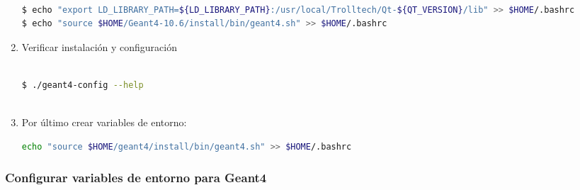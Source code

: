 \begin{enumerate}
\begin{lstlisting}[language=bash,style=mystyle]

$ echo "export LD_LIBRARY_PATH=${LD_LIBRARY_PATH}:/usr/local/Trolltech/Qt-${QT_VERSION}/lib" >> $HOME/.bashrc
$ echo "source $HOME/Geant4-10.6/install/bin/geant4.sh" >> $HOME/.bashrc


\end{lstlisting}     


    \item Verificar instalación y configuración


\begin{lstlisting}[language=bash,style=mystyle]

$ ./geant4-config --help
 
\end{lstlisting} 

\item Por último crear variables de entorno:


\begin{lstlisting}[language=bash,style=mystyle]
echo "source $HOME/geant4/install/bin/geant4.sh" >> $HOME/.bashrc
\end{lstlisting} 

\end{enumerate}

\newpage

\subsubsection{Configurar variables de entorno para Geant4}

